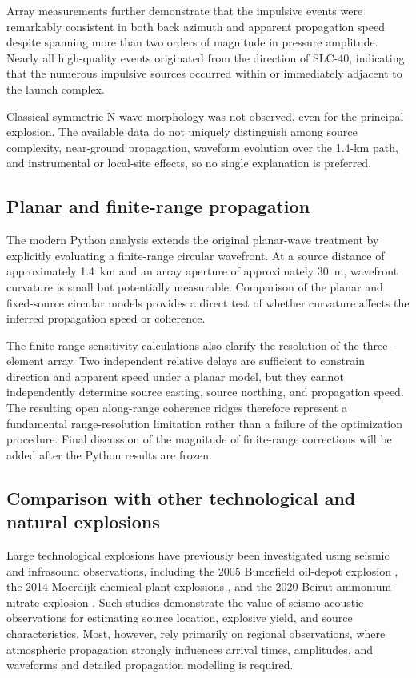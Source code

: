 \documentclass[]{seismica}
\begin{document}
Array measurements further demonstrate that the impulsive events were remarkably consistent in both back azimuth and apparent propagation speed despite spanning more than two orders of magnitude in pressure amplitude. Nearly all high-quality events originated from the direction of SLC-40, indicating that the numerous impulsive sources occurred within or immediately adjacent to the launch complex.

Classical symmetric N-wave morphology was not observed, even for the
principal explosion. The available data do not uniquely distinguish among
source complexity, near-ground propagation, waveform evolution over the
1.4-km path, and instrumental or local-site effects, so no single explanation
is preferred.

\subsection{Planar and finite-range propagation}
\label{sec:discussion_propagation}

The modern Python analysis extends the original planar-wave treatment by explicitly evaluating a finite-range circular wavefront. At a source distance of approximately 1.4~km and an array aperture of approximately 30~m, wavefront curvature is small but potentially measurable. Comparison of the planar and fixed-source circular models provides a direct test of whether curvature affects the inferred propagation speed or coherence.

The finite-range sensitivity calculations also clarify the resolution of the three-element array. Two independent relative delays are sufficient to constrain direction and apparent speed under a planar model, but they cannot independently determine source easting, source northing, and propagation speed. The resulting open along-range coherence ridges therefore represent a fundamental range-resolution limitation rather than a failure of the optimization procedure. Final discussion of the magnitude of finite-range corrections will be added after the Python results are frozen.

\subsection{Comparison with other technological and natural explosions}
\label{sec:discussion_comparison}

Large technological explosions have previously been investigated using
seismic and infrasound observations, including the 2005 Buncefield oil-depot
explosion \citep{ottemoller_2008,green_2008,ceranna_2009}, the 2014 Moerdijk
chemical-plant explosions \citep{smink_2019}, and the 2020 Beirut
ammonium-nitrate explosion
\citep{pilger_beirut_2021,kim_pasyanos_2022}. Such studies demonstrate the value of seismo-acoustic observations for estimating source location, explosive yield, and source characteristics. Most, however, rely primarily on regional observations, where atmospheric propagation strongly influences arrival times, amplitudes, and waveforms and detailed propagation modelling is required.
\end{document}
